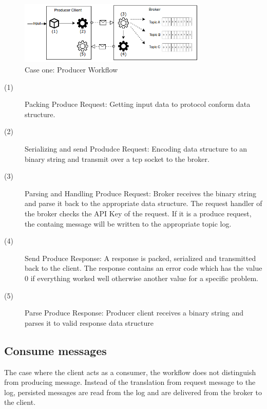 \begin{figure}[H]
    \centering
    \includegraphics[width=0.8\textwidth]{images/concept_producer.png}
    \caption{Case one: Producer Workflow}
    \label{fig:conept-producer}
\end{figure}

\begin{description}
    \item [(1)] 
        {Packing Produce Request: Getting input data to protocol conform data structure.}
    \item [(2)] 
        {Serializing and send Produdce Request: Encoding data structure to an
            binary  string and transmit over a tcp socket to the broker.}
    \item [(3)] 
        {Parsing and Handling Produce Request: Broker receives the binary string
            and parse it back to the appropriate data structure. The request
            handler of the  broker checks the API Key of the request. If it is a
            produce request, the containg message will be written to the
            appropriate topic log.}
    \item [(4)] 
        {Send Produce Response: A response is packed, serialized and transmitted
            back to the client. The response contains an error code which has
            the value 0 if everything worked well otherwise another value for a
            specific problem. }
    \item [(5)] 
        {Parse Produce Response: Producer client receives a binary string and
            parses it to valid response data structure }
\end{description}

\subsection{Consume messages}

The case where the client acts as a consumer, the workflow does not distinguish from
producing message. Instead of the translation from request message to the log, persisted messages
are read from the log and are delivered from the broker to the client.

